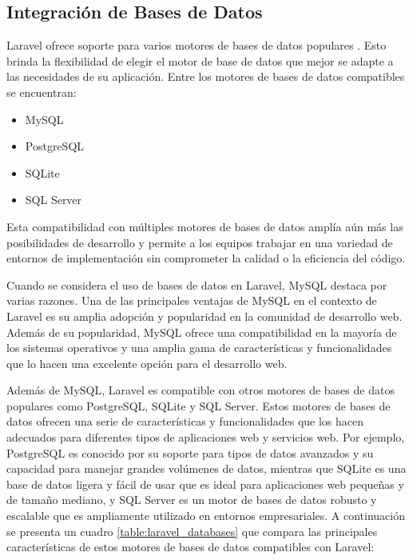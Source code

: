 \subsection{Integración de Bases de Datos}
Laravel ofrece soporte para varios motores de bases de datos populares \cite{DB}. Esto brinda la flexibilidad de elegir el motor de base de datos que mejor se adapte a las necesidades de su aplicación. Entre los motores de bases de datos compatibles se encuentran:

\begin{itemize}
\item MySQL
\item PostgreSQL
\item SQLite
\item SQL Server
\end{itemize}

Esta compatibilidad con múltiples motores de bases de datos amplía aún más las posibilidades de desarrollo y permite a los equipos trabajar en una variedad de entornos de implementación sin comprometer la calidad o la eficiencia del código.

Cuando se considera el uso de bases de datos en Laravel, MySQL destaca por varias razones. Una de las principales ventajas de MySQL en el contexto de Laravel es su amplia adopción y popularidad en la comunidad de desarrollo web. Además de su popularidad, MySQL ofrece una compatibilidad en la mayoría de los sistemas operativos y una amplia gama de características y funcionalidades que lo hacen una excelente opción para el desarrollo web.

Además de MySQL, Laravel es compatible con otros motores de bases de datos populares como PostgreSQL, SQLite y SQL Server. Estos motores de bases de datos ofrecen una serie de características y funcionalidades que los hacen adecuados para diferentes tipos de aplicaciones web y servicios web. Por ejemplo, PostgreSQL es conocido por su soporte para tipos de datos avanzados y su capacidad para manejar grandes volúmenes de datos, mientras que SQLite es una base de datos ligera y fácil de usar que es ideal para aplicaciones web pequeñas y de tamaño mediano, y SQL Server es un motor de bases de datos robusto y escalable que es ampliamente utilizado en entornos empresariales. A continuación se presenta un cuadro \ref{table:laravel_databases} que compara las principales características de estos motores de bases de datos compatibles con Laravel:

